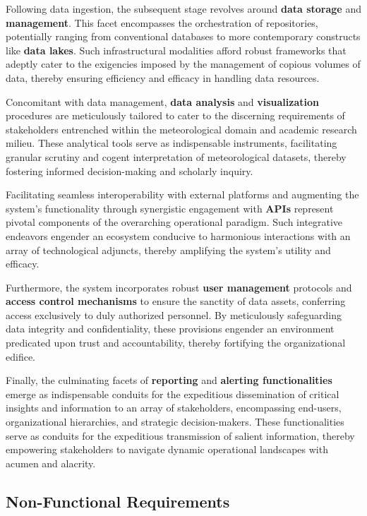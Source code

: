 Following data ingestion, the subsequent stage revolves around \textbf{data
    storage} and \textbf{management}. This facet encompasses the orchestration
    of repositories, potentially ranging from conventional databases to more
    contemporary constructs like \textbf{data lakes}. Such infrastructural
    modalities afford robust frameworks that adeptly cater to the exigencies
    imposed by the management of copious volumes of data, thereby ensuring
    efficiency and efficacy in handling data resources.

Concomitant with data management, \textbf{data analysis} and
\textbf{visualization} procedures are meticulously tailored to cater to the
discerning requirements of stakeholders entrenched within the meteorological
domain and academic research milieu. These analytical tools serve as
indispensable instruments, facilitating granular scrutiny and cogent
interpretation of meteorological datasets, thereby fostering informed
decision-making and scholarly inquiry.

Facilitating seamless interoperability with external platforms and augmenting
the system's functionality through synergistic engagement with \textbf{APIs}
represent pivotal components of the overarching operational paradigm. Such
integrative endeavors engender an ecosystem conducive to harmonious interactions
with an array of technological adjuncts, thereby amplifying the system's utility
and efficacy.

Furthermore, the system incorporates robust \textbf{user management} protocols
and \textbf{access control mechanisms} to ensure the sanctity of data assets,
conferring access exclusively to duly authorized personnel. By meticulously
safeguarding data integrity and confidentiality, these provisions engender an
environment predicated upon trust and accountability, thereby fortifying the
organizational edifice.

Finally, the culminating facets of \textbf{reporting} and \textbf{alerting
    functionalities} emerge as indispensable conduits for the expeditious
    dissemination of critical insights and information to an array of
    stakeholders, encompassing end-users, organizational hierarchies, and
    strategic decision-makers. These functionalities serve as conduits for the
    expeditious transmission of salient information, thereby empowering
    stakeholders to navigate dynamic operational landscapes with acumen and
    alacrity.

\subsection{Non-Functional Requirements}

